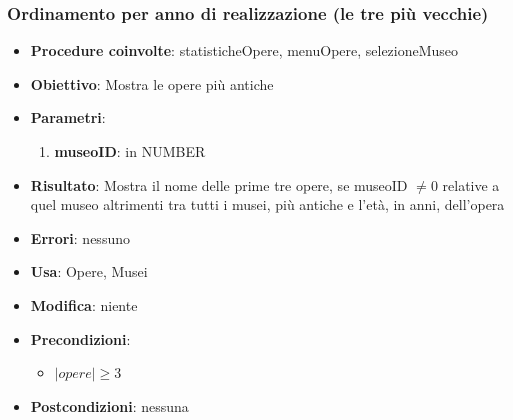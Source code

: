 \subsubsection{Ordinamento per anno di realizzazione (le tre più vecchie)}
\begin{itemize}
	\item \textbf{Procedure coinvolte}: statisticheOpere, menuOpere, selezioneMuseo
	\item \textbf{Obiettivo}: Mostra le opere più antiche
	\item \textbf{Parametri}:
	\begin{enumerate}
		\item \textbf{museoID}: in NUMBER
	\end{enumerate}
	\item \textbf{Risultato}: Mostra il nome delle prime tre opere, se museoID $\neq 0$ relative a quel museo altrimenti tra tutti i musei, più antiche e l'età, in anni, dell'opera
	\item \textbf{Errori}: nessuno
	\item \textbf{Usa}: Opere, Musei
	\item \textbf{Modifica}: niente
	\item \textbf{Precondizioni}:
	\begin{itemize}
		\item $|opere| \ge 3$
	\end{itemize}
	\item \textbf{Postcondizioni}: nessuna
\end{itemize}

